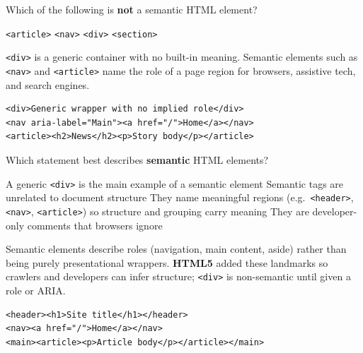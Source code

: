 \question[4]
Which of the following is \textbf{not} a semantic HTML element?
\begin{choices}
  \choice \texttt{<article>}
  \choice \texttt{<nav>}
  \CorrectChoice \texttt{<div>}
  \choice \texttt{<section>}
\end{choices}
\begin{solution}
  \texttt{<div>} is a generic container with no built-in meaning. Semantic elements such as \texttt{<nav>} and \texttt{<article>} name the role of a page region for browsers, assistive tech, and search engines.
\begin{lstlisting}[style=htmlinline]
<div>Generic wrapper with no implied role</div>
<nav aria-label="Main"><a href="/">Home</a></nav>
<article><h2>News</h2><p>Story body</p></article>
\end{lstlisting}
\end{solution}

\question[4]
Which statement best describes \textbf{semantic} HTML elements?
\begin{choices}
  \choice A generic \texttt{<div>} is the main example of a semantic element
  \choice Semantic tags are unrelated to document structure
  \CorrectChoice They name meaningful regions (e.g.\ \texttt{<header>}, \texttt{<nav>}, \texttt{<article>}) so structure and grouping carry meaning
  \choice They are developer-only comments that browsers ignore
\end{choices}
\begin{solution}
  Semantic elements describe roles (navigation, main content, aside) rather than being purely presentational wrappers. \textbf{HTML5} added these landmarks so crawlers and developers can infer structure; \texttt{<div>} is non-semantic until given a role or ARIA.
\begin{lstlisting}[style=htmlinline]
<header><h1>Site title</h1></header>
<nav><a href="/">Home</a></nav>
<main><article><p>Article body</p></article></main>
\end{lstlisting}
\end{solution}

